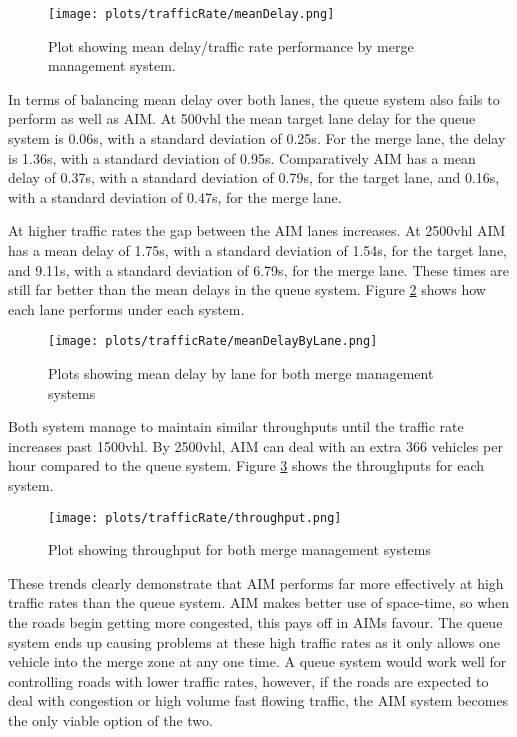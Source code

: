 \begin{figure}[htb]
\texttt{[image: plots/trafficRate/meanDelay.png]}
\caption{Plot showing mean delay/traffic rate performance by merge management system.}
\label{fig:meanDelayTrafficRate}
\end{figure}

In terms of balancing mean delay over both lanes, the queue system also fails to perform as well as AIM. At 500\si{vhl} the mean target lane delay for the queue system is 0.06\si{s}, with a standard deviation of 0.25\si{s}. For the merge lane, the delay is 1.36\si{s}, with a standard deviation of 0.95\si{s}. Comparatively AIM has a mean delay of 0.37\si{s}, with a standard deviation of 0.79\si{s}, for the target lane, and 0.16\si{s}, with a standard deviation of 0.47\si{s}, for the merge lane. 

At higher traffic rates the gap between the AIM lanes increases. At 2500\si{vhl} AIM has a mean delay of 1.75\si{s}, with a standard deviation of 1.54\si{s}, for the target lane, and 9.11\si{s}, with a standard deviation of 6.79\si{s}, for the merge lane. These times are still far better than the mean delays in the queue system. Figure \ref{fig:meanDelayByLaneTrafficRate} shows how each lane performs under each system.

\begin{figure}[htb]
\texttt{[image: plots/trafficRate/meanDelayByLane.png]}
\caption{Plots showing mean delay by lane for both merge management systems}
\label{fig:meanDelayByLaneTrafficRate}
\end{figure}

Both system manage to maintain similar throughputs until the traffic rate increases past 1500\si{vhl}. By 2500\si{vhl}, AIM can deal with an extra 366 vehicles per hour compared to the queue system. Figure \ref{fig:throughputTrafficRate} shows the throughputs for each system.

\begin{figure}[htb]
\centering
\texttt{[image: plots/trafficRate/throughput.png]}
\caption{Plot showing throughput for both merge management systems}
\label{fig:throughputTrafficRate}
\end{figure}

These trends clearly demonstrate that AIM performs far more effectively at high traffic rates than the queue system. AIM makes better use of space-time, so when the roads begin getting more congested, this pays off in AIMs favour. The queue system ends up causing problems at these high traffic rates as it only allows one vehicle into the merge zone at any one time. A queue system would work well for controlling roads with lower traffic rates, however, if the roads are expected to deal with congestion or high volume fast flowing traffic, the AIM system becomes the only viable option of the two.


